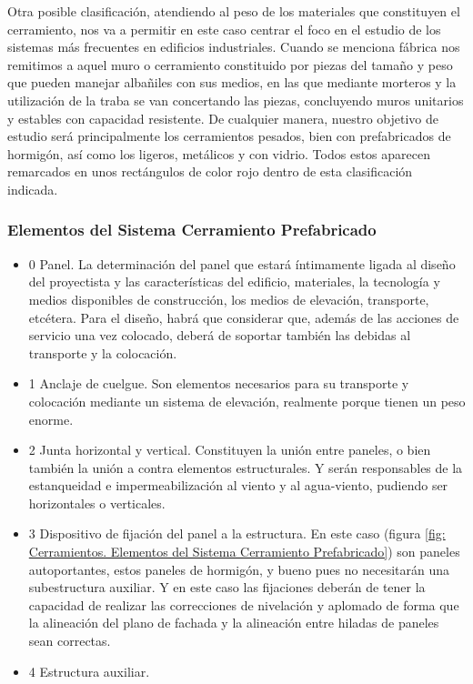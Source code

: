 Otra posible clasificación, atendiendo al peso de los materiales que constituyen el cerramiento, nos va a permitir en este caso centrar el foco en el estudio de los sistemas más frecuentes en edificios industriales. Cuando se menciona fábrica nos remitimos a aquel muro o cerramiento constituido por piezas del tamaño y peso que pueden manejar albañiles con sus medios, en las que mediante morteros y la utilización de la traba se van concertando las piezas, concluyendo muros unitarios y estables con capacidad resistente. De cualquier manera, nuestro objetivo de estudio será principalmente los cerramientos pesados, bien con prefabricados de hormigón, así como los ligeros, metálicos y con vidrio. Todos estos aparecen remarcados en unos rectángulos de color rojo dentro de esta clasificación indicada.

\subsubsection*{Elementos del Sistema Cerramiento Prefabricado}

\begin{itemize}
    \item 0 Panel. La determinación del panel que estará íntimamente ligada al diseño del proyectista y las características del edificio, materiales, la tecnología y medios disponibles de construcción, los medios de elevación, transporte, etcétera. Para el diseño, habrá que considerar que, además de las acciones de servicio una vez colocado, deberá de soportar también las debidas al transporte y la colocación.
    \item 1 Anclaje de cuelgue. Son elementos necesarios para su transporte y colocación mediante un sistema de elevación, realmente porque tienen un peso enorme.
    \item 2 Junta horizontal y vertical. Constituyen la unión entre paneles, o bien también la unión a contra elementos estructurales. Y serán responsables de la estanqueidad e impermeabilización al viento y al agua-viento, pudiendo ser horizontales o verticales.
    \item 3 Dispositivo de fijación del panel a la estructura. En este caso (figura \ref{fig: Cerramientos. Elementos del Sistema Cerramiento Prefabricado}) son paneles autoportantes, estos paneles de hormigón, y bueno pues no necesitarán una subestructura auxiliar. Y en este caso las fijaciones deberán de tener la capacidad de realizar las correcciones de nivelación y aplomado de forma que la alineación del plano de fachada y la alineación entre hiladas de paneles sean correctas.
    \item 4 Estructura auxiliar.
\end{itemize}

